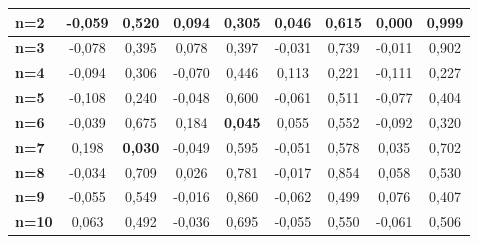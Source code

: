 \documentclass[10pt,twoside]{article}
\begin{document}
\begin{table}
\begin{center}
\begin{scriptsize}
\begin{tabular}{|l|c|c|c|c|c|c|c|c|}
    \textbf{n=2}  & -0,059 & 0,520          & 0,094  & 0,305          & 0,046  & 0,615 & 0,000  & 0,999 \\ \hline
    \textbf{n=3}  & -0,078 & 0,395          & 0,078  & 0,397          & -0,031 & 0,739 & -0,011 & 0,902 \\ \hline
    \textbf{n=4}  & -0,094 & 0,306          & -0,070 & 0,446          & 0,113  & 0,221 & -0,111 & 0,227 \\ \hline
    \textbf{n=5}  & -0,108 & 0,240          & -0,048 & 0,600          & -0,061 & 0,511 & -0,077 & 0,404 \\ \hline
    \textbf{n=6}  & -0,039 & 0,675          & 0,184  & \textbf{0,045} & 0,055  & 0,552 & -0,092 & 0,320 \\ \hline
    \textbf{n=7}  & 0,198  & \textbf{0,030} & -0,049 & 0,595          & -0,051 & 0,578 & 0,035  & 0,702 \\ \hline
    \textbf{n=8}  & -0,034 & 0,709          & 0,026  & 0,781          & -0,017 & 0,854 & 0,058  & 0,530 \\ \hline
    \textbf{n=9}  & -0,055 & 0,549          & -0,016 & 0,860          & -0,062 & 0,499 & 0,076  & 0,407 \\ \hline
    \textbf{n=10} & 0,063  & 0,492          & -0,036 & 0,695          & -0,055 & 0,550 & -0,061 & 0,506 \\ \hline
    
    \end{tabular}
    \begin{tabular}{|l|c|c|c|c|c|c|c|c|}

    
    

\end{tabular}
\end{scriptsize}
\end{center}
\end{table}
\end{document}
